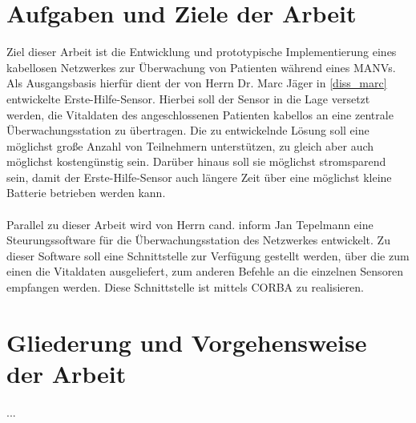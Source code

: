 \section{Aufgaben und Ziele der Arbeit}
Ziel dieser Arbeit ist die Entwicklung und prototypische Implementierung eines
kabellosen Netzwerkes zur Überwachung von Patienten während eines MANVs. Als
Ausgangsbasis hierfür dient der von Herrn Dr. Marc Jäger in \ref{diss_marc}
entwickelte Erste-Hilfe-Sensor. Hierbei soll der Sensor in die Lage versetzt
werden, die Vitaldaten des angeschlossenen Patienten kabellos an eine zentrale
Überwachungsstation zu übertragen. Die zu entwickelnde Lösung soll eine möglichst
große Anzahl von Teilnehmern unterstützen, zu gleich aber auch möglichst kostengünstig
sein. Darüber hinaus soll sie möglichst stromsparend sein, damit der Erste-Hilfe-Sensor
auch längere Zeit über eine möglichst kleine Batterie betrieben werden kann.\\
\\
Parallel zu dieser Arbeit wird von Herrn cand. inform Jan Tepelmann eine 
Steurungssoftware für die Überwachungsstation des Netzwerkes entwickelt. Zu dieser
Software soll eine Schnittstelle zur Verfügung gestellt werden, über die zum einen
die Vitaldaten ausgeliefert, zum anderen Befehle an die einzelnen Sensoren empfangen 
werden. Diese Schnittstelle ist mittels CORBA zu realisieren.

\section{Gliederung und Vorgehensweise der Arbeit}
...
